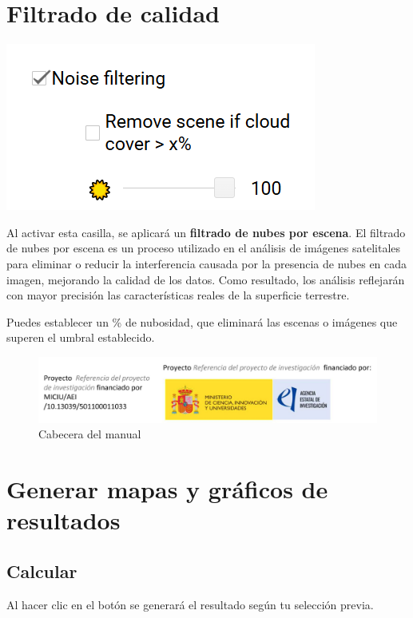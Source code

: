 \documentclass[
]{book}
\begin{document}
\chapter{Filtrado de calidad}\label{filtrado-nubes}

\includegraphics{assets/filter.png}

Al activar esta casilla, se aplicará un \textbf{filtrado de nubes por escena}. El filtrado de nubes por escena es un proceso utilizado en el análisis de imágenes satelitales para eliminar o reducir la interferencia causada por la presencia de nubes en cada imagen, mejorando la calidad de los datos. Como resultado, los análisis reflejarán con mayor precisión las características reales de la superficie terrestre.

Puedes establecer un \% de nubosidad, que eliminará las escenas o imágenes que superen el umbral establecido.

\begin{figure}
\centering
\includegraphics{assets/logo.jpeg}
\caption{Cabecera del manual}
\end{figure}

\chapter{Generar mapas y gráficos de resultados}\label{mapas-graficos}

\section{\texorpdfstring{\textbf{Calcular}}{Calcular}}\label{calcular-1}

Al hacer clic en el botón se generará el resultado según tu selección previa.
\end{document}
